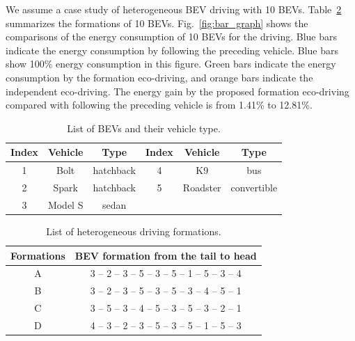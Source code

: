 \documentclass{IEEEtran}
\begin{document}
We assume a case study of heterogeneous BEV driving with 10 BEVs. Table~\ref{table:list_formation} summarizes the formations of 10 BEVs. 
Fig.~\ref{fig:bar_graph} shows the comparisons of the energy consumption of 10 BEVs for the driving. Blue bars indicate the energy consumption by following the preceding vehicle. Blue bars show 100\% energy consumption in this figure. Green bars indicate the energy consumption by the formation eco-driving, and orange bars indicate the independent eco-driving.
The energy gain by the proposed formation eco-driving compared with following the preceding vehicle is from 1.41\% to 12.81\%. 


\begin{table} 	%
\centering
\small
\caption{List of BEVs and their vehicle type.}
\label{table:list_EVs}
\begin{tabular}{|c|c|c|c|c|c|} \hline
Index	&Vehicle	&Type		&Index	&Vehicle	&Type 	\\ \hline
1		&Bolt	&hatchback	&4		&K9		&bus			\\ \hline	
2		&Spark	&hatchback	&5		&Roadster&convertible 	\\ \hline
3		&Model S	&sedan	\\ \cline{1-3}
\end{tabular}
\end{table}



\begin{table} 	%
\centering
\small
\caption{List of heterogeneous driving formations.}
\label{table:list_formation}
\begin{tabular}{|c|c|} \hline
Formations	& BEV formation from the tail to head	\\ \hline
A	&3 -- 2 -- 3 -- 5 -- 3 -- 5 -- 1 -- 5 -- 3 -- 4	\\ \hline
B	&3 -- 2 -- 3 -- 5 -- 3 -- 5 -- 3 -- 4 -- 5 -- 1	\\ \hline
C	&3 -- 5 -- 3 -- 4 -- 5 -- 3 -- 5 -- 3 -- 2 -- 1	\\ \hline
D	&4 -- 3 -- 2 -- 3 -- 5 -- 3 -- 5 -- 1 -- 5 -- 3	\\ \hline
\end{tabular}
\end{table}
\end{document}
